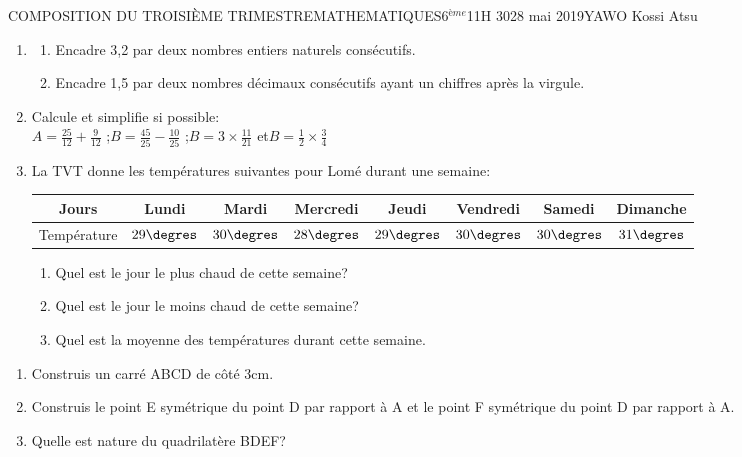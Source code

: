\documentclass[12pt,a4paper]{book}
\newcommand{\prof}{YAWO Kossi Atsu}
\newcommand{\matiere}{MATHEMATIQUES}
\newcommand{\classe}{6$^{ème}$}
\begin{document}
\begin{devoir}{COMPOSITION DU TROISIÈME TRIMESTRE}{\matiere}{\classe}{1}{1H 30}{28 mai 2019}{\prof}
\begin{exo}[6]
\begin{enumerate}
\item \begin{enumerate}
\item Encadre 3,2 par deux nombres entiers naturels consécutifs.
\item Encadre 1,5 par deux nombres décimaux consécutifs ayant un chiffres après la virgule.
\end{enumerate}
\item Calcule et simplifie si possible:\\
$A=\frac{25}{12}+\frac{9}{12}$ \qquad ;\qquad $B=\frac{45}{25}-\frac{10}{25}$ \qquad ;\qquad $B=3 \times\frac{11}{21}$ \qquad et\qquad $B=\frac{1}{2} \times \frac{3}{4}$
\item La TVT donne les températures suivantes pour Lomé durant une semaine:
\begin{tabular}{|c|c|c|c|c|c|c|c|}
\hline 
Jours & Lundi & Mardi & Mercredi & Jeudi & Vendredi & Samedi & Dimanche \\ 
\hline 
Température & $29\degres$ & $30\degres$ & $28\degres$ & $29\degres$ & $30\degres$ & $30\degres$ & $31\degres$ \\ 
\hline 
\end{tabular} 
\begin{enumerate}
\item Quel est le jour le plus chaud de cette semaine?
\item Quel est le jour le moins chaud de cette semaine?
\item Quel est la moyenne des températures durant cette semaine.
\end{enumerate}
\end{enumerate}
\vspace{0.3cm}
\end{exo}

\begin{exo}[4]
\begin{enumerate}
\item Construis un carré ABCD de côté 3cm.
\item Construis le point E symétrique du point D par rapport à A et le point F symétrique du point D par rapport à A.
\item Quelle est nature du quadrilatère BDEF?
\end{enumerate}
\end{exo}
\end{devoir}
\end{document}
